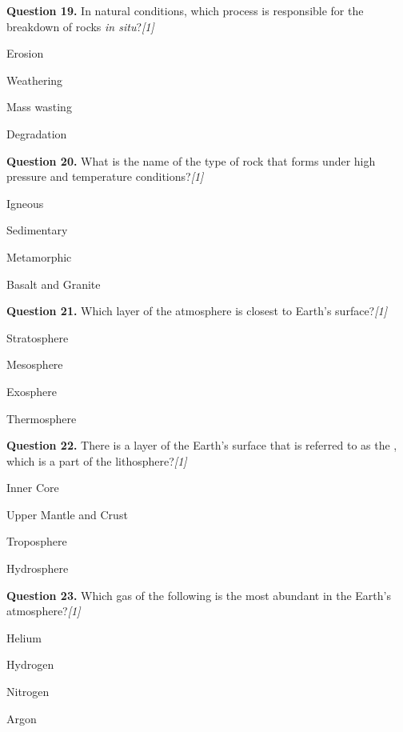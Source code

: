 \documentclass[11pt,a4paper]{article}
\newcommand{\pts}[1]{\hfill \textit{[#1]}}
\begin{document}
\medskip

\noindent \textbf{Question 19.} In natural conditions, which process is responsible for the breakdown of rocks \textit{in situ}?\pts{1}
\begin{parts}
  \item Erosion
  \item Weathering
  \item Mass wasting
  \item Degradation
\end{parts}

\medskip

\noindent \textbf{Question 20.} What is the name of the type of rock that forms under high pressure and temperature conditions?\pts{1}
\begin{parts}
  \item Igneous
  \item Sedimentary
  \item Metamorphic
  \item Basalt and Granite
\end{parts}

\medskip

\noindent \textbf{Question 21.} Which layer of the atmosphere is closest to Earth's surface?\pts{1}
\begin{parts}
  \item Stratosphere
  \item Mesosphere
  \item Exosphere
  \item Thermosphere
\end{parts}

\medskip

\noindent \textbf{Question 22.} There is a layer of the Earth's surface that is referred to as the \underline{\hspace{2cm}}, which is a part of the lithosphere?\pts{1}
\begin{parts}
  \item Inner Core
  \item Upper Mantle and Crust
  \item Troposphere
  \item Hydrosphere
\end{parts}

\medskip

\noindent \textbf{Question 23.} Which gas of the following is the most abundant in the Earth's atmosphere?\pts{1}
\begin{parts}
  \item Helium
  \item Hydrogen
  \item Nitrogen
  \item Argon
\end{parts}
\end{document}
